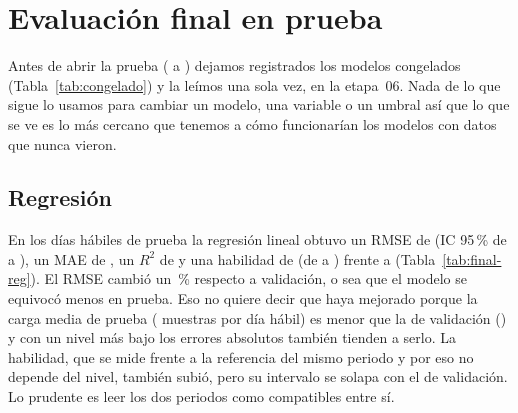 \section{Evaluación final en prueba}
\label{sec:evaluacion}

Antes de abrir la prueba (\FinPruebaDesde{} a \FinPruebaHasta{}) dejamos registrados los
modelos congelados (Tabla~\ref{tab:congelado}) y la leímos una sola vez, en
la etapa~06. Nada de lo que sigue lo usamos para cambiar un modelo, una
variable o un umbral así que lo que se ve es lo más cercano que tenemos a
cómo funcionarían los modelos con datos que nunca vieron.

\begin{table}[!htbp]
\centering
{}
\caption{Modelos congelados antes de abrir la prueba, cada uno con la cifra
de validación que lo justificó.}
\label{tab:congelado}
\end{table}

\subsection{Regresión}

En los \FinDiasPrueba{} días hábiles de prueba la regresión lineal obtuvo un
RMSE de \FinRMSEPrueba{} (IC 95\,\% de \FinRMSEPruebaInf{} a
\FinRMSEPruebaSup{}), un MAE de \FinMAEPrueba{}, un $R^2$ de \FinRDosPrueba{}
y una habilidad de \FinHabilidadPrueba{} (de \FinHabilidadPruebaInf{} a
\FinHabilidadPruebaSup{}) frente a \codigo{\FinRegReferencia}
(Tabla~\ref{tab:final-reg}). El RMSE cambió un \FinCambioRMSEPct{}\,\%
respecto a validación, o sea que el modelo se equivocó menos en prueba. Eso
no quiere decir que haya mejorado porque la carga media de prueba
(\FinMediaPrueba{} muestras por día hábil) es menor que la de validación
(\RegMediaValidacion{}) y con un nivel más bajo los errores absolutos también
tienden a serlo. La habilidad, que se mide frente a la referencia del mismo
periodo y por eso no depende del nivel, también subió, pero su intervalo se
solapa con el de validación. Lo prudente es leer los dos periodos como
compatibles entre sí.

